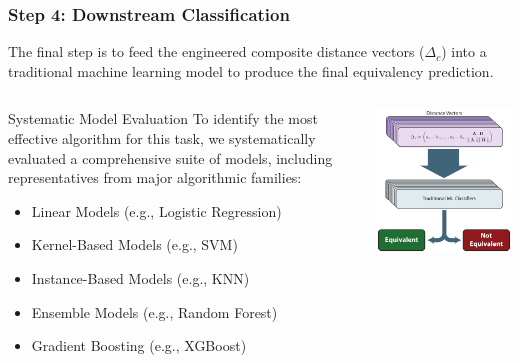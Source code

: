 \documentclass[aspectratio=169,10pt]{beamer}
\begin{document}
\begin{frame}
    \frametitle{Step 4: Downstream Classification}
    
    The final step is to feed the engineered composite distance vectors (\(\Delta_c\)) into a traditional machine learning model to produce the final equivalency prediction.
    
    \begin{columns}[T]
        \begin{column}{0.57\textwidth}
            \hfill\vspace{3mm}
            \begin{block}{Systematic Model Evaluation}
                To identify the most effective algorithm for this task, we systematically evaluated a comprehensive suite of models, including representatives from major algorithmic families:
                \begin{itemize}
                    \item Linear Models (e.g., Logistic Regression)
                    \item Kernel-Based Models (e.g., SVM)
                    \item Instance-Based Models (e.g., KNN)
                    \item Ensemble Models (e.g., Random Forest)
                    \item Gradient Boosting (e.g., XGBoost)
                \end{itemize}
            \end{block}
        \end{column}
        
        \begin{column}{0.38\textwidth}
            \centering
            \includegraphics[width=\textwidth]{downstream_classification.pdf}
        \end{column}
    \end{columns}


\end{frame}
\end{document}
